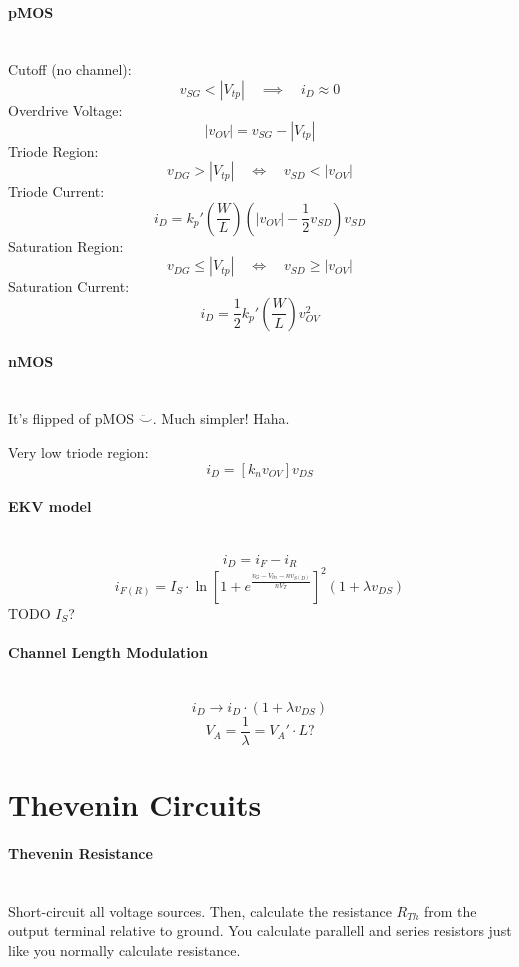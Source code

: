 \documentclass[twocolumn]{article}
\begin{document}
    \paragraph{pMOS} \hfill \\
      Cutoff (no channel):
        $$v_{SG} < |V_{tp}| \quad\implies\quad i_D \approx 0$$
      Overdrive Voltage:
        $$|v_{OV}| = v_{SG} - |V_{tp}|$$
      Triode Region:
        $$v_{DG} > |V_{tp}| \quad\Leftrightarrow\quad v_{SD} < |v_{OV}|$$
      Triode Current:
        $$i_D = k_p' \left( \frac{W}{L} \right)
                     \left( |v_{OV}| - \frac{1}{2} v_{SD} \right) v_{SD}$$
      Saturation Region:
        $$v_{DG} \leq |V_{tp}| \quad\Leftrightarrow\quad v_{SD} \geq |v_{OV}|$$
      Saturation Current:
        $$i_D = \frac{1}{2} k_p' \left( \frac{W}{L} \right) v_{OV}^2$$
    \paragraph{nMOS} \hfill \\
      It's flipped of pMOS $\ddot\smile$. Much simpler! Haha.

      Very low triode region:
        $$i_D = [k_n v_{OV}] v_{DS}$$
    \paragraph{EKV model} \hfill \\
      $$i_D = i_F - i_R$$
      $$i_{F(R)} = I_S \cdot
                   \ln \left[ 1 + e^{\frac{v_G - V_{tn} - nv_{S(D)}}{nV_T}}
                       \right] ^2
                   (1 + \lambda v_{DS})$$
      TODO $I_S$?
    \paragraph{Channel Length Modulation} \hfill \\
      $$i_D \to i_D \cdot (1 + \lambda v_{DS})$$
      $$V_A = \frac{1}{\lambda} = V_A' \cdot L?$$

  \section{Thevenin Circuits}
    \paragraph{Thevenin Resistance} \hfill \\
      Short-circuit all voltage sources.
      Then, calculate the resistance $R_{Th}$ from the output terminal relative
      to ground.
      You calculate parallell and series resistors just like you normally
     calculate resistance.
\end{document}
